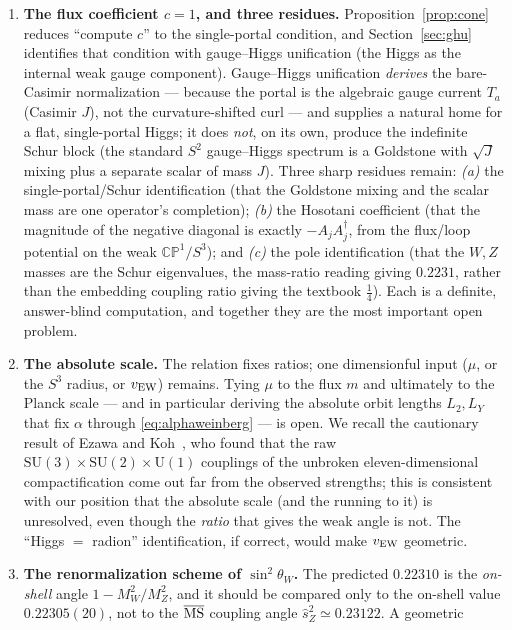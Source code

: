 \documentclass[11pt]{article}
\theoremstyle{plain}
\theoremstyle{definition}
\newcommand{\sinsq}{\sin^{2}\theta_W}
\newcommand{\SU}{\mathrm{SU}}
\newcommand{\U}{\mathrm{U}}
\begin{document}
\begin{enumerate}
\item \textbf{The flux coefficient $c=1$, and three residues.}
Proposition~\ref{prop:cone} reduces ``compute $c$'' to the single-portal
condition, and Section~\ref{sec:ghu} identifies that condition with
gauge--Higgs unification (the Higgs as the internal weak gauge component).
Gauge--Higgs unification \emph{derives} the bare-Casimir normalization ---
because the portal is the algebraic gauge current $T_a$ (Casimir $J$), not the
curvature-shifted curl --- and supplies a natural home for a flat,
single-portal Higgs; it does \emph{not}, on its own, produce the indefinite
Schur block (the standard $S^2$ gauge--Higgs spectrum is a Goldstone with
$\sqrt J$ mixing plus a separate scalar of mass $J$). Three sharp residues
remain: \emph{(a)} the single-portal/Schur identification (that the Goldstone
mixing and the scalar mass are one operator's completion); \emph{(b)} the
Hosotani coefficient (that the magnitude of the negative diagonal is exactly
$-A_jA_j^\dagger$, from the flux/loop potential on the weak
$\mathbb{CP}^1/S^3$); and \emph{(c)} the pole identification (that the $W,Z$
masses are the Schur eigenvalues, the mass-ratio reading giving $0.2231$,
rather than the embedding coupling ratio giving the textbook $\tfrac14$).
Each is a definite, answer-blind computation, and together they are the most
important open problem.
\item \textbf{The absolute scale.} The relation fixes ratios; one
dimensionful input ($\mu$, or the $S^3$ radius, or $v_{\rm EW}$) remains.
Tying $\mu$ to the flux $m$ and ultimately to the Planck scale --- and in
particular deriving the absolute orbit lengths $L_2,L_Y$ that fix $\alpha$
through \eqref{eq:alphaweinberg} --- is open. We recall the cautionary
result of Ezawa and Koh~\cite{EzawaKoh1984}, who found that the raw
$\SU(3)\times\SU(2)\times\U(1)$ couplings of the unbroken
eleven-dimensional compactification come out far from the observed
strengths; this is consistent with our position that the absolute scale (and
the running to it) is unresolved, even though the \emph{ratio} that gives the
weak angle is not. The ``Higgs $=$ radion'' identification, if correct,
would make $v_{\rm EW}$ geometric.
\item \textbf{The renormalization scheme of $\sinsq$.} The predicted
$0.22310$ is the \emph{on-shell} angle $1-M_W^2/M_Z^2$, and it should be
compared only to the on-shell value $0.22305(20)$, not to the
$\overline{\rm MS}$ coupling angle $\hat s_Z^2\simeq0.23122$. A geometric

\end{enumerate}
\end{document}
